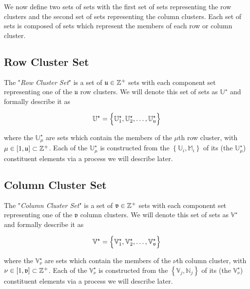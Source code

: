 \documentclass[../../ClusteringConnectionsMAIN.tex]{subfiles}
\begin{document}
\begin{flushleft}
\begin{large}


We now define two sets of sets with the first set of sets representing the row clusters and the second set of sets representing the column clusters.  Each set of sets is composed of sets which represent the members of each row or column cluster.


\subsection{Row Cluster Set}

The "\emph{Row Cluster Set}" is a set of $\mathfrak{u} \in \mathbb{Z}^+$ sets with each component set representing one of the $\mathfrak{u}$ row clusters.  We will denote this set of sets as $\mathbb{U}^\star$ and formally describe it as

\begin{align*}
\mathbb{U}^\star = \Bigl\{ \mathbb{U}^\star_1, \mathbb{U}^\star_2, \dots, \mathbb{U}^\star_\mathfrak{u} \Bigr\}
\end{align*}

where the $\mathbb{U}^\star_\mu$ are sets which contain the members of the $\mu$th row cluster, with $\mu \in \left[ 1, \mathfrak{u} \right] \subset \mathbb{Z}^+$.  Each of the $\mathbb{U}^\star_\mu$ is constructed from the $\left\{ \mathbb{U}_i, \mathbb{M}_i \right\}$ of its (the $\mathbb{U}^\star_\mu$) constituent elements via a process we will describe later.


\subsection{Column Cluster Set}

The "\emph{Column Cluster Set}" is a set of $\mathfrak{v} \in \mathbb{Z}^+$ sets with each component set representing one of the $\mathfrak{v}$ column clusters.  We will denote this set of sets as $\mathbb{V}^\star$ and formally describe it as

\begin{align*}
\mathbb{V}^\star = \Bigl\{ \mathbb{V}^\star_1, \mathbb{V}^\star_2, \dots, \mathbb{V}^\star_\mathfrak{v} \Bigr\}
\end{align*}

where the $\mathbb{V}^\star_\nu$ are sets which contain the members of the $\nu$th column cluster, with $\nu \in \left[ 1, \mathfrak{v} \right] \subset \mathbb{Z}^+$.  Each of the $\mathbb{V}^\star_\nu$ is constructed from the $\left\{ \mathbb{V}_j, \mathbb{N}_j \right\}$ of its (the $\mathbb{V}^\star_\nu$) constituent elements via a process we will describe later.


\end{large}
\end{flushleft}
\end{document}
